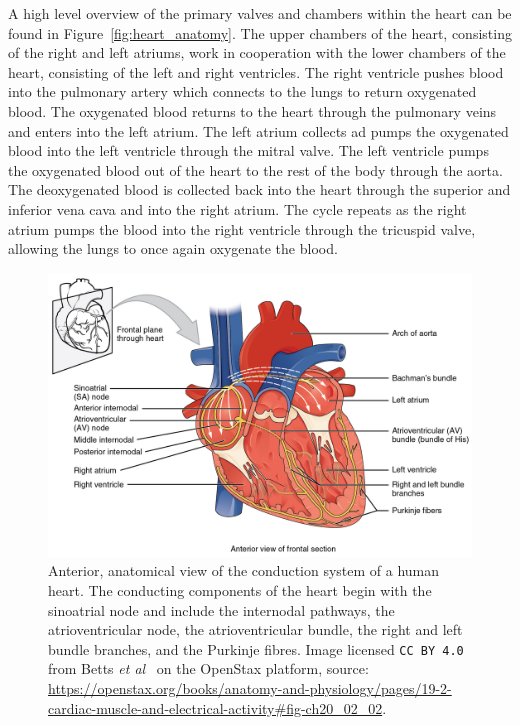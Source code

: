 \documentclass[\main/thesis.tex]{subfiles}
\begin{document}
A high level overview of the primary valves and chambers within the heart can be found in Figure~\ref{fig:heart_anatomy}.
The upper chambers of the heart, consisting of the right and left atriums, work in cooperation with the lower chambers of the heart, consisting of the left and right ventricles.
The right ventricle pushes blood into the pulmonary artery which connects to the lungs to return oxygenated blood.
The oxygenated blood returns to the heart through the pulmonary veins and enters into the left atrium.
The left atrium collects ad pumps the oxygenated blood into the left ventricle through the mitral valve.
The left ventricle pumps the oxygenated blood out of the heart to the rest of the body through the aorta.
The deoxygenated blood is collected back into the heart through the superior and inferior vena cava and into the right atrium.
The cycle repeats as the right atrium pumps the blood into the right ventricle through the tricuspid valve, allowing the lungs to once again oxygenate the blood.

\begin{figure}[ht]
    \centering
    \includegraphics[width=14cm]{figure/conduction-system-of-the-heart.jpeg}
    \caption[Anterior, anatomical view of the conduction system of a human heart.]{Anterior, anatomical view of the conduction system of a human heart. The conducting components of the heart begin with the sinoatrial node and include the internodal pathways, the atrioventricular node, the atrioventricular bundle, the right and left bundle branches, and the Purkinje fibres.
    Image licensed \texttt{CC BY 4.0} from Betts \emph{et al}~\cite{betts-anatomy-and-physiology} on the OpenStax platform, source: \url{https://openstax.org/books/anatomy-and-physiology/pages/19-2-cardiac-muscle-and-electrical-activity\#fig-ch20_02_02}.}
    \label{fig:heart_conduction_system}
\end{figure}
\end{document}
